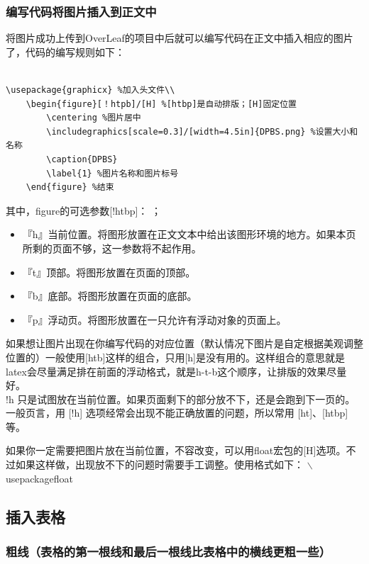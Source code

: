 \documentclass{article}
\begin{document}
\subsubsection{编写代码将图片插入到正文中}
将图片成功上传到OverLeaf的项目中后就可以编写代码在正文中插入相应的图片了，代码的编写规则如下：
\begin{lstlisting}

\usepackage{graphicx} %加入头文件\\
    \begin{figure}[！htpb]/[H] %[htbp]是自动排版；[H]固定位置 
        \centering %图片居中         
        \includegraphics[scale=0.3]/[width=4.5in]{DPBS.png} %设置大小和名称 
        \caption{DPBS}
        \label{1} %图片名称和图片标号 
    \end{figure} %结束 
\end{lstlisting}
其中，{figure}的可选参数[!htbp]： ； 
\begin{itemize}
    \item 『h』当前位置。将图形放置在正文文本中给出该图形环境的地方。如果本页所剩的页面不够，这一参数将不起作用。
\item『t』顶部。将图形放置在页面的顶部。
\item『b』底部。将图形放置在页面的底部。
\item『p』浮动页。将图形放置在一只允许有浮动对象的页面上。
\end{itemize}

如果想让图片出现在你编写代码的对应位置（默认情况下图片是自定根据美观调整位置的）一般使用[htb]这样的组合，只用[h]是没有用的。这样组合的意思就是latex会尽量满足排在前面的浮动格式，就是h-t-b这个顺序，让排版的效果尽量好。\\
!h 只是试图放在当前位置。如果页面剩下的部分放不下，还是会跑到下一页的。一般页言，用 [!h] 选项经常会出现不能正确放置的问题，所以常用 [ht]、[htbp] 等。

如果你一定需要把图片放在当前位置，不容改变，可以用float宏包的[H]选项。不过如果这样做，出现放不下的问题时需要手工调整。使用格式如下：
$\backslash$usepackage{float}

\subsection{插入表格}



\subsubsection{粗线（表格的第一根线和最后一根线比表格中的横线更粗一些）}
\end{document}
